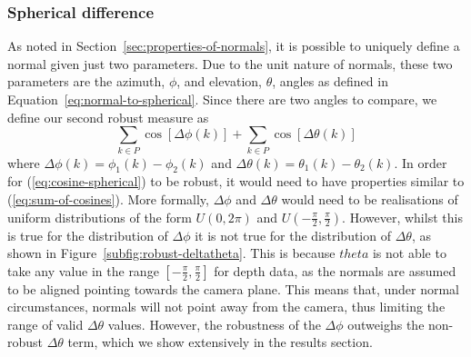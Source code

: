 \subsubsection{Spherical difference}\label{subsubsec:spherical-normals}
As noted in Section~\ref{sec:properties-of-normals}, it is possible to uniquely define a normal given just two parameters. Due to the unit nature of normals, these two parameters are the azimuth, $\phi$, and elevation, $\theta$, angles as defined in Equation~\ref{eq:normal-to-spherical}. Since there are two angles to compare, we define our second robust measure as
\begin{equation}\label{eq:cosine-spherical}
    \sum_{k \in P} \cos[\Delta \phi (k)] + \sum_{k \in P} \cos[\Delta \theta (k)]
\end{equation}
where $\Delta \phi (k) = \phi_1 (k) - \phi_2 (k)$ and $\Delta \theta (k) = \theta_1 (k) - \theta_2 (k)$. In order for (\ref{eq:cosine-spherical}) to be robust, it would need to have properties similar to (\ref{eq:sum-of-cosines}). More formally, $\Delta \phi$ and $\Delta \theta$ would need to be realisations of uniform distributions of the form $U(0, 2 \pi)$ and $U(-\frac{\pi}{2}, \frac{\pi}{2})$. However, whilst this is true for the distribution of $\Delta \phi$ it is not true for the distribution of $\Delta \theta$, as shown in Figure~\ref{subfig:robust-deltatheta}. This is because $theta$ is not able to take any value in the range $[-\frac{\pi}{2}, \frac{\pi}{2}]$ for depth data, as the normals are assumed to be aligned pointing towards the camera plane. This means that, under normal circumstances, normals will not point away from the camera, thus limiting the range of valid $\Delta \theta$ values. However, the robustness of the $\Delta \phi$ outweighs the non-robust $\Delta \theta$ term, which we show extensively in the results section.

